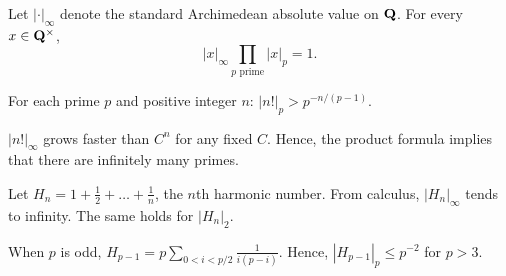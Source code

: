 \begin{prob}\label{prob:07} Let $|\cdot|_{\infty}$ denote the standard Archimedean absolute value on $\mathbf{Q}$. For every $x \in \mathbf{Q}^{\times}$, 
\[ |x|_{\infty} \prod_{p\text{ prime}} |x|_{p} = 1.\]   
\end{prob}


\factfact

\begin{prob}\label{prob:08} For each prime $p$ and  positive integer $n$: \quad $|n!|_{p} > p^{-n/(p-1)}$. \end{prob}

\begin{prob}\label{prob:09} $|n!|_{\infty}$ grows faster than $C^n$ for any fixed $C$. Hence, the product formula implies that there are infinitely many primes. \end{prob}

\psh

\begin{prob}\label{prob:10} Let $H_n = 1 + \frac12 +  \dots + \frac1n$, the $n$th \textsf{harmonic number}. From calculus, $|H_n|_{\infty}$ tends to infinity. The same holds for $|H_n|_{2}$.
\end{prob}


\begin{prob}[Wolstenholme]\label{prob:11}\label{prob:wolstenholme} When $p$ is odd, $H_{p-1} = p \sum_{0 < i < p/2} \frac{1}{i(p-i)}$. Hence,  $|H_{p-1}|_{p} \le p^{-2}$ for $p > 3$.
\end{prob}







%

